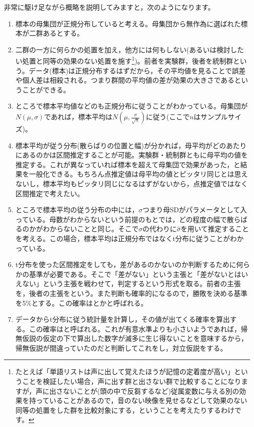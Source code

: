 \documentclass{ltjsbook}
\begin{document}
非常に駆け足ながら概略を説明してみますと，次のようになります。
\begin{enumerate}
    \item 標本の母集団が正規分布していると考える。母集団から無作為に選ばれた標本が二群あるとする。
    \item 二群の一方に何らかの処置を加え，他方には何もしない(あるいは検討したい処置と同等の効果のない処置を施す\footnote{たとえば「単語リストは声に出して覚えたほうが記憶の定着度が高い」ということを検証したい場合，声に出す群と出さない群で比較することになりますが，声に出さないことが(頭の中で反芻するなど)従属変数に与える別の効果を持っていることがあるので，音のない映像を見せるなどして効果のない同等の処置をした群を比較対象にする，ということを考えたりするわけです。})。前者を実験群，後者を統制群という。データ(標本)は正規分布するはずだから，その平均値を見ることで誤差や個人差は相殺される。つまり群間の平均値の差が効果の大きさであるということができる。
    \item ところで標本平均値などのも正規分布に従うことがわかっている。母集団が$N(\mu,\sigma)$であれば，標本平均は$N(\mu, \frac{\sigma}{\sqrt{n}})$に従う(ここで$n$はサンプルサイズ)。
    \item 標本平均が従う分布(散らばりの位置と幅)が分かれば，母平均がどのあたりにあるのかは区間推定することが可能。実験群・統制群ともに母平均の値を推定する。これが異なっていれば標本を超えて母集団で効果があった，と結果を一般化できる。もちろん点推定値は母平均の値とピッタリ同じとは思えないし，標本平均もピッタリ同じになるはずがないから，点推定値ではなく区間推定で考えたい。
    \item ところで標本平均の従う分布の中には，$\sigma$つまり母SDがパラメータとして入っている。母数がわからないという前提のもとでは，どの程度の幅で散らばるのかがわからないことと同じ。そこで$\sigma$の代わりに$\hat{\sigma}$を用いて推定することを考える。この場合，標本平均は正規分布ではなくt分布に従うことがわかっている。
    \item t分布を使った区間推定をしても，差があるのかないのか判断するために何らかの基準が必要である。そこで「差がない」という主張と「差がないとはいえない」という主張を戦わせて，判定するという形式を取る。前者の主張を，後者の主張をという。また判断も確率的になるので，勝敗を決める基準を5\%とする。この確率はとかと呼ばれる。
    \item データからt分布に従う統計量を計算し，その値が出てくる確率を算出する。この確率はと呼ばれる。これが有意水準よりも小さいようであれば，帰無仮説の仮定の下で算出した数字が滅多に生じ得ないことを意味するから，帰無仮説が間違っていたのだと判断してこれをし，対立仮説をする。
\end{enumerate}
\end{document}
